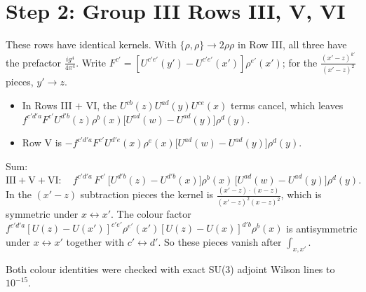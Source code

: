 \documentclass[9pt]{article}
\numberwithin{equation}{section}
\begin{document}
\section{Step 2: Group III Rows III, V, VI}
These rows have identical kernels. With $\{\rho,\rho\}\to2\rho\rho$ in Row III, all three have the prefactor $\frac{ig^{4}}{4\pi^{4}}$. Write $F^{c'}=[U^{c'e'}(y')-U^{c'e'}(x')]\rho^{e'}(x')$; for the $\frac{(x'-z)^{k'}}{(x'-z)^{2}}$ pieces, $y'\to z$.
\begin{itemize}
\item In Rows III $+$ VI, the $U^{cb}(z)U^{ad}(y)U^{ce}(x)$ terms cancel, which leaves $f^{c'd'a}F^{c'}U^{d'b}(z)\rho^{b}(x)\big[U^{ad}(w)-U^{ad}(y)\big]\rho^{d}(y)$.
\item Row V is $-f^{c'd'a}F^{c'}U^{d'e}(x)\rho^{e}(x)\big[U^{ad}(w)-U^{ad}(y)\big]\rho^{d}(y)$.
\end{itemize}
Sum:
\begin{equation}
\text{III}+\text{V}+\text{VI}:\quad f^{c'd'a}\,F^{c'}\,\big[U^{d'b}(z)-U^{d'b}(x)\big]\rho^{b}(x)\,\big[U^{ad}(w)-U^{ad}(y)\big]\rho^{d}(y).
\end{equation}
In the $(x'-z)$ subtraction pieces the kernel is $\frac{(x'-z)\cdot(x-z)}{(x'-z)^{2}(x-z)^{2}}$, which is symmetric under $x\leftrightarrow x'$. The colour factor $f^{c'd'a}[U(z)-U(x')]^{c'e'}\rho^{e'}(x')[U(z)-U(x)]^{d'b}\rho^{b}(x)$ is antisymmetric under $x\leftrightarrow x'$ together with $c'\leftrightarrow d'$. So these pieces vanish after $\int_{x,x'}$.

\noindent Both colour identities were checked with exact SU(3) adjoint Wilson lines to $10^{-15}$.
\end{document}
